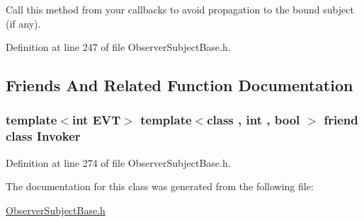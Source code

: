 Call this method from your callbacks to avoid propagation to the bound subject (if any). 



Definition at line 247 of file Observer\+Subject\+Base.\+h.



\subsection{Friends And Related Function Documentation}
\subsubsection[{\texorpdfstring{Invoker}{Invoker}}]{\setlength{\rightskip}{0pt plus 5cm}template$<$int E\+VT$>$ template$<$class , int , bool $>$ friend class {\bf Invoker}\hspace{0.3cm}{\ttfamily [friend]}}\hypertarget{classocra_1_1ObserverBase_a63f148e01d4fc8e06b665e920abe3794}{}\label{classocra_1_1ObserverBase_a63f148e01d4fc8e06b665e920abe3794}


Definition at line 274 of file Observer\+Subject\+Base.\+h.



The documentation for this class was generated from the following file\+:\begin{DoxyCompactItemize}
\item 
\hyperlink{ObserverSubjectBase_8h}{Observer\+Subject\+Base.\+h}\end{DoxyCompactItemize}
